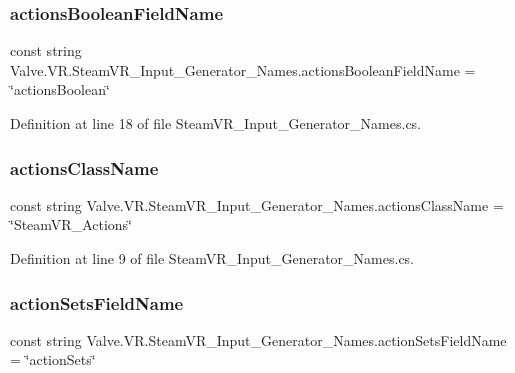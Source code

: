 \subsubsection{\texorpdfstring{actionsBooleanFieldName}{actionsBooleanFieldName}}
{\footnotesize\ttfamily const string Valve.\+V\+R.\+Steam\+V\+R\+\_\+\+Input\+\_\+\+Generator\+\_\+\+Names.\+actions\+Boolean\+Field\+Name = \char`\"{}actions\+Boolean\char`\"{}}



Definition at line 18 of file Steam\+V\+R\+\_\+\+Input\+\_\+\+Generator\+\_\+\+Names.\+cs.

\mbox{\label{class_valve_1_1_v_r_1_1_steam_v_r___input___generator___names_a64c7fbc8f7b1a3402a05c17bd3d013e5}} 
\subsubsection{\texorpdfstring{actionsClassName}{actionsClassName}}
{\footnotesize\ttfamily const string Valve.\+V\+R.\+Steam\+V\+R\+\_\+\+Input\+\_\+\+Generator\+\_\+\+Names.\+actions\+Class\+Name = \char`\"{}Steam\+V\+R\+\_\+\+Actions\char`\"{}}



Definition at line 9 of file Steam\+V\+R\+\_\+\+Input\+\_\+\+Generator\+\_\+\+Names.\+cs.

\mbox{\label{class_valve_1_1_v_r_1_1_steam_v_r___input___generator___names_aea3636f5c17c23995bb3ec9a16fee2f3}} 
\subsubsection{\texorpdfstring{actionSetsFieldName}{actionSetsFieldName}}
{\footnotesize\ttfamily const string Valve.\+V\+R.\+Steam\+V\+R\+\_\+\+Input\+\_\+\+Generator\+\_\+\+Names.\+action\+Sets\+Field\+Name = \char`\"{}action\+Sets\char`\"{}}



